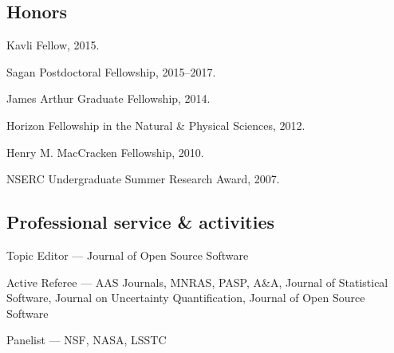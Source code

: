 \documentclass[12pt,letterpaper]{article}
\begin{document}
\subsection{Honors}
\begin{list}{}{\cvlist}

  \item Kavli Fellow, 2015.
  \item Sagan Postdoctoral Fellowship, 2015--2017.
  \item James Arthur Graduate Fellowship, 2014.
  \item Horizon Fellowship in the Natural \& Physical Sciences, 2012.
  \item Henry M. MacCracken Fellowship, 2010.
  \item NSERC Undergraduate Summer Research Award, 2007.

\end{list}


\subsection{Professional service \& activities}
\begin{list}{}{\cvlist}
  \item Topic Editor --- Journal of Open Source Software
  \item Active Referee ---
        AAS Journals,
        MNRAS,
        PASP,
        A\&A,
        Journal of Statistical Software,
        Journal on Uncertainty Quantification,
        Journal of Open Source Software
  \item Panelist ---
        NSF, NASA, LSSTC
\end{list}
\end{document}

